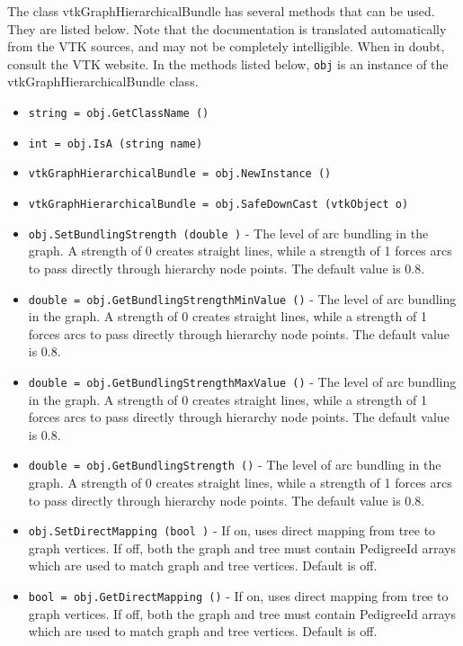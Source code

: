 The class vtkGraphHierarchicalBundle has several methods that can be used.
  They are listed below.
Note that the documentation is translated automatically from the VTK sources,
and may not be completely intelligible.  When in doubt, consult the VTK website.
In the methods listed below, \verb|obj| is an instance of the vtkGraphHierarchicalBundle class.
\begin{itemize}
\item  \verb|string = obj.GetClassName ()|

\item  \verb|int = obj.IsA (string name)|

\item  \verb|vtkGraphHierarchicalBundle = obj.NewInstance ()|

\item  \verb|vtkGraphHierarchicalBundle = obj.SafeDownCast (vtkObject o)|

\item  \verb|obj.SetBundlingStrength (double )| -  The level of arc bundling in the graph.
 A strength of 0 creates straight lines, while a strength of 1
 forces arcs to pass directly through hierarchy node points.
 The default value is 0.8.

\item  \verb|double = obj.GetBundlingStrengthMinValue ()| -  The level of arc bundling in the graph.
 A strength of 0 creates straight lines, while a strength of 1
 forces arcs to pass directly through hierarchy node points.
 The default value is 0.8.

\item  \verb|double = obj.GetBundlingStrengthMaxValue ()| -  The level of arc bundling in the graph.
 A strength of 0 creates straight lines, while a strength of 1
 forces arcs to pass directly through hierarchy node points.
 The default value is 0.8.

\item  \verb|double = obj.GetBundlingStrength ()| -  The level of arc bundling in the graph.
 A strength of 0 creates straight lines, while a strength of 1
 forces arcs to pass directly through hierarchy node points.
 The default value is 0.8.

\item  \verb|obj.SetDirectMapping (bool )| -  If on, uses direct mapping from tree to graph vertices.
 If off, both the graph and tree must contain PedigreeId arrays
 which are used to match graph and tree vertices.
 Default is off.

\item  \verb|bool = obj.GetDirectMapping ()| -  If on, uses direct mapping from tree to graph vertices.
 If off, both the graph and tree must contain PedigreeId arrays
 which are used to match graph and tree vertices.
 Default is off.


\end{itemize}
